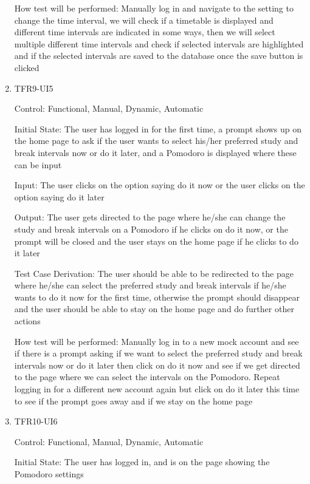 \documentclass[12pt, titlepage]{article}
\begin{document}
\begin{enumerate}[resume]
  How test will be performed: Manually log in and navigate to the setting to change the time interval, we will check if a timetable is displayed and  different time intervals are indicated in some ways, then we will select multiple different time intervals and check if selected intervals are highlighted and if the selected intervals are saved to the database once the save button is clicked 
  
  
  \item{TFR9-UI5\\}
  
  Control: Functional, Manual, Dynamic, Automatic
            
  Initial State: The user has logged in for the first time, a prompt shows up on the home page to ask if the user wants to select his/her preferred study and break intervals now or do it later, and a Pomodoro is displayed where these can be input
            
  Input: The user clicks on the option saying do it now or the user clicks on the option saying do it later
            
  Output: The user gets directed to the page where he/she can change the study and break intervals on a Pomodoro if he clicks on do it now, or the prompt will be closed and the user stays on the home page if he clicks to do it later
  
  Test Case Derivation: The user should be able to be redirected to the page where he/she can select the preferred study and break intervals if he/she wants to do it now for the first time, otherwise the prompt should disappear and the user should be able to stay on the home page and do further other actions
            
  How test will be performed: Manually log in to a new mock account and see if there is a prompt asking if we want to select the preferred study and break intervals now or do it later then click on do it now and see if we get directed to the page where we can select the intervals on the Pomodoro. Repeat logging in for a different new account again but click on do it later this time to see if the prompt goes away and if we stay on the home page
            
  \item{TFR10-UI6\\}
  
  Control: Functional, Manual, Dynamic, Automatic
            
  Initial State: The user has logged in, and is on the page showing the Pomodoro settings
            

\end{enumerate}
\end{document}
